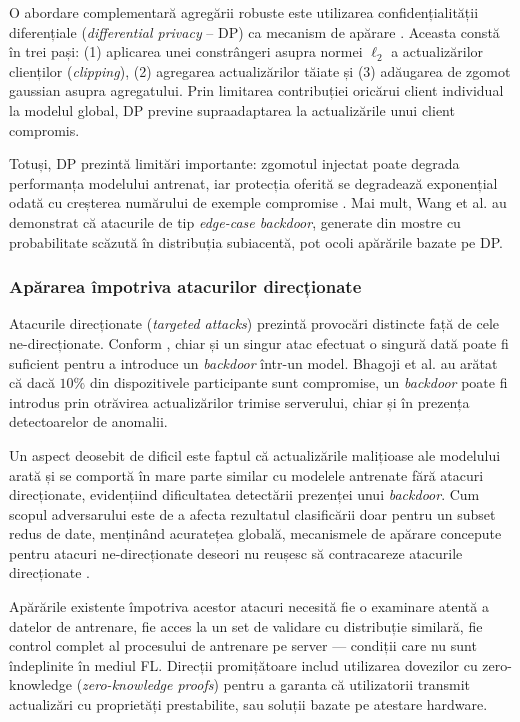 \documentclass[../../main.tex]{subfiles}
\begin{document}
    O abordare complementară agregării robuste este utilizarea confidențialității diferențiale (\textit{differential privacy} -- DP) ca mecanism de apărare \cite{kairouz2021federated}. Aceasta constă în trei pași: (1) aplicarea unei constrângeri asupra normei $\ell_2$ a actualizărilor clienților (\textit{clipping}), (2) agregarea actualizărilor tăiate și (3) adăugarea de zgomot gaussian asupra agregatului. Prin limitarea contribuției oricărui client individual la modelul global, DP previne supraadaptarea la actualizările unui client compromis.

    Totuși, DP prezintă limitări importante: zgomotul injectat poate degrada performanța modelului antrenat, iar protecția oferită se degradează exponențial odată cu creșterea numărului de exemple compromise \cite{kairouz2021federated}. Mai mult, Wang et al. au demonstrat că atacurile de tip \textit{edge-case backdoor}, generate din mostre cu probabilitate scăzută în distribuția subiacentă, pot ocoli apărările bazate pe DP.

    \subsubsection{Apărarea împotriva atacurilor direcționate}

    Atacurile direcționate (\textit{targeted attacks}) prezintă provocări distincte față de cele ne-direcționate. Conform \cite{kairouz2021federated}, chiar și un singur atac efectuat o singură dată poate fi suficient pentru a introduce un \textit{backdoor} într-un model. Bhagoji et al. au arătat că dacă $10\%$ din dispozitivele participante sunt compromise, un \textit{backdoor} poate fi introdus prin otrăvirea actualizărilor trimise serverului, chiar și în prezența detectoarelor de anomalii.

    Un aspect deosebit de dificil este faptul că actualizările malițioase ale modelului arată și se comportă în mare parte similar cu modelele antrenate fără atacuri direcționate, evidențiind dificultatea detectării prezenței unui \textit{backdoor}. Cum scopul adversarului este de a afecta rezultatul clasificării doar pentru un subset redus de date, menținând acuratețea globală, mecanismele de apărare concepute pentru atacuri ne-direcționate deseori nu reușesc să contracareze atacurile direcționate \cite{kairouz2021federated}.

    Apărările existente împotriva acestor atacuri necesită fie o examinare atentă a datelor de antrenare, fie acces la un set de validare cu distribuție similară, fie control complet al procesului de antrenare pe server --- condiții care nu sunt îndeplinite în mediul FL. Direcții promițătoare includ utilizarea dovezilor cu zero-knowledge (\textit{zero-knowledge proofs}) pentru a garanta că utilizatorii transmit actualizări cu proprietăți prestabilite, sau soluții bazate pe atestare hardware.
\end{document}
